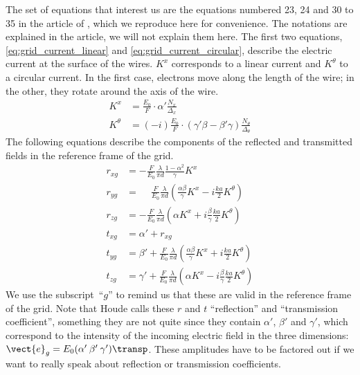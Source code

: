 The set of equations that interest us are the equations numbered 23, 24 and 30 to 35 in the article of \citeauthor{houde_2001} \cite{houde_2001}, which we reproduce here for convenience.
The notations are explained in the article, we will not explain them here.
The first two equations, \eqref{eq:grid_current_linear} and \eqref{eq:grid_current_circular}, describe the electric current at the surface of the wires.
$K^x$ corresponds to a linear current and $K^\theta$ to a circular current.
In the first case, electrons move along the length of the wire; in the other, they rotate around the axis of the wire.
\begin{align}
    K^x &= \frac{E_0}{F} \cdot \alpha' \frac{N_x}{\Delta_x}
    \label{eq:grid_current_linear}
    \\
    K^\theta &= (-i) \frac{E_0}{F} \cdot (\gamma' \beta - \beta' \gamma) \frac{N_\theta}{\Delta_\theta}
    \label{eq:grid_current_circular}
\end{align}
The following equations describe the components of the reflected and transmitted fields in the reference frame of the grid.
\begin{align}
    r_{xg}
    &=
    -\frac{F}{E_0}
    \frac{\lambda}{\pi d}
    \frac{1 - \alpha^2}{\gamma} K^x
    \label{eq:houde_Rx}
    \\
    r_{yg}
    &=
    \phantom{-}
    \frac{F}{E_0}
    \frac{\lambda}{\pi d}
    \left(
        \frac{\alpha \beta}{\gamma} K^x
        -
        i \frac{ka}{2} K^\theta
    \right)
    \\
    r_{zg}
    &=
    -\frac{F}{E_0}
    \frac{\lambda}{\pi d}
    \left(
       \alpha K^x
       +
       i \frac{\beta}{\gamma} \frac{ka}{2} K^\theta
    \right)
    \\
    t_{xg} &= \alpha' + r_{xg}
    \\
    t_{yg}
    &=
    \beta' +
    \frac{F}{E_0}
    \frac{\lambda}{\pi d}
    \left(
        \frac{\alpha \beta}{\gamma} K^x + i \frac{ka}{2} K^\theta
    \right)
    \\
    t_{zg}
    &=
    \gamma' +
    \frac{F}{E_0}
    \frac{\lambda}{\pi d}
    \left(
        \alpha K^x - i \frac{\beta}{\gamma} \frac{ka}{2} K^\theta
    \right)
\end{align}
We use the subscript~``$g$'' to remind us that these are valid in the reference frame of the grid.
Note that Houde calls these $r$ and $t$ ``reflection'' and ``transmission coefficient'', something they are not quite since they contain $\alpha'$, $\beta'$ and $\gamma'$, which correspond to the intensity of the incoming electric field in the three dimensions: $\vect{e}_g=E_0 (\alpha' \: \beta' \: \gamma')\transp$.
These amplitudes have to be factored out if we want to really speak about reflection or transmission coefficients.

